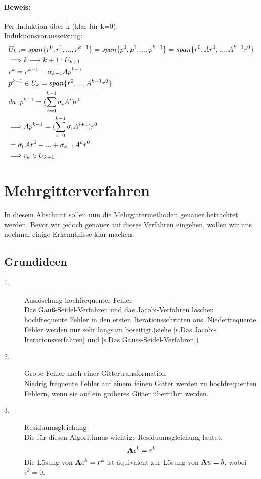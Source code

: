 \subsubsection{Beweis:}
Per Induktion über k (klar für k=0):
\\Induktionsvoraussetzung:
\begin{align*}
& U_{k} := span\{r^{0}, r^{1},...,r^{k-1}\} = span\{p^{0},p^{1},...,p^{k-1}\} = span\{r^{0}, Ar^{0},...,A^{k-1}r^{0}\}\\
& \Longrightarrow k \longrightarrow k+1: U_{k+1}\\
& r^{k} = r^{k-1} - \alpha_{k-1} Ap^{k-1}\\
& p^{k-1} \in U_{k} = span\{r^{0},...,A^{k-1}r^{0}\}\\
& da \hspace{2mm} p^{k-1} = (\sum_{i=0}^{k-1} \sigma_{i}A^{i})r^{0}\\
& \Longrightarrow Ap^{k-1} = (\sum_{i=0}^{k-1} \sigma_{i}A^{i+1})r^{0}\\
& = \sigma_{0}Ar^{0} + ... + \sigma_{k-1}A^{k}r^{0}\\
& \Longrightarrow r_{k} \in U_{k+1}
\end{align*}

\chapter{Mehrgitterverfahren}\label{c.Mehrgitterverfahren}

In diesem Abschnitt sollen nun die Mehrgittermethoden genauer betrachtet werden. Bevor wir jedoch genauer auf dieses Verfahren eingehen, wollen wir uns nochmal einige Erkenntnisse klar machen:

\section{Grundideen}

\begin{description}

\item[1.] Auslöschung hochfrequenter Fehler \\
Das Gauß-Seidel-Verfahren und das Jacobi-Verfahren löschen hochfrequente Fehler in den ersten Iterationsschritten aus. Niederfrequente Fehler werden nur sehr langsam beseitigt.(siehe \autoref{s.Das Jacobi-Iterationsverfahren} und \autoref{s.Das Gauss-Seidel-Verfahren})
\item[2.] Grobe Fehler nach einer Gittertransformation \\
Niedrig frequente Fehler auf einem feinen Gitter werden zu hochfrequenten Fehlern, wenn sie auf ein gröberes Gitter überführt werden.
\item[3.] Residuumsgleichung \\
Die für diesen Algorithmus wichtige Residuumsgleichung lautet:
\begin{equation}
{\textbf{A}} \epsilon^{k} = r^{k}\label{eq.Residuumsgleichung}
\end{equation}
Die Lösung von ${\textbf{A}} \epsilon^{k} = r^{k}$ ist äquivalent zur Lösung von ${\textbf{A}}u=b$, wobei $\epsilon^{k} = 0$.

\end{description}

